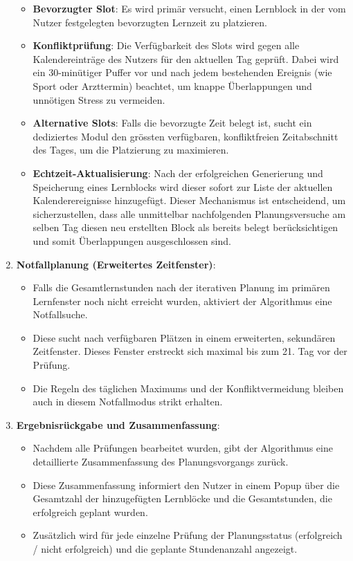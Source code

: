 \documentclass[12pt,a4paper]{report}
\begin{document}
\begin{enumerate}
\begin{itemize}
        \item \textbf{Bevorzugter Slot}: Es wird primär versucht, einen Lernblock in der vom Nutzer festgelegten bevorzugten Lernzeit zu platzieren.
        \item \textbf{Konfliktprüfung}: Die Verfügbarkeit des Slots wird gegen alle Kalendereinträge des Nutzers für den aktuellen Tag geprüft. Dabei wird ein 30-minütiger Puffer vor und nach jedem bestehenden Ereignis (wie Sport oder Arzttermin) beachtet, um knappe Überlappungen und unnötigen Stress zu vermeiden.
        \item \textbf{Alternative Slots}: Falls die bevorzugte Zeit belegt ist, sucht ein dediziertes Modul den grössten verfügbaren, konfliktfreien Zeitabschnitt des Tages, um die Platzierung zu maximieren.
        \item \textbf{Echtzeit-Aktualisierung}: Nach der erfolgreichen Generierung und Speicherung eines Lernblocks wird dieser sofort zur Liste der aktuellen Kalenderereignisse hinzugefügt. Dieser Mechanismus ist entscheidend, um sicherzustellen, dass alle unmittelbar nachfolgenden Planungsversuche am selben Tag diesen neu erstellten Block als bereits belegt berücksichtigen und somit Überlappungen ausgeschlossen sind.
    \end{itemize}
    \item \textbf{Notfallplanung (Erweitertes Zeitfenster)}:
    \begin{itemize}
        \item Falls die Gesamtlernstunden nach der iterativen Planung im primären Lernfenster noch nicht erreicht wurden, aktiviert der Algorithmus eine Notfallsuche.
        \item Diese sucht nach verfügbaren Plätzen in einem erweiterten, sekundären Zeitfenster. Dieses Fenster erstreckt sich maximal bis zum 21. Tag vor der Prüfung.
        \item Die Regeln des täglichen Maximums und der Konfliktvermeidung bleiben auch in diesem Notfallmodus strikt erhalten.
    \end{itemize}
    \item \textbf{Ergebnisrückgabe und Zusammenfassung}:
    \begin{itemize}
        \item Nachdem alle Prüfungen bearbeitet wurden, gibt der Algorithmus eine detaillierte Zusammenfassung des Planungsvorgangs zurück.
        \item Diese Zusammenfassung informiert den Nutzer in einem Popup über die Gesamtzahl der hinzugefügten Lernblöcke und die Gesamtstunden, die erfolgreich geplant wurden.
        \item Zusätzlich wird für jede einzelne Prüfung der Planungsstatus (erfolgreich / nicht erfolgreich) und die geplante Stundenanzahl angezeigt.
    \end{itemize}
\end{enumerate}
\end{document}
